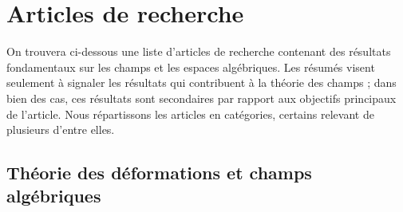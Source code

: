 \section{Articles de recherche}
\label{section-papers}

\noindent
On trouvera ci-dessous une liste d'articles de recherche contenant des résultats
fondamentaux sur les champs et les espaces algébriques. Les résumés visent seulement
à signaler les résultats qui contribuent à la théorie des champs ; dans bien des cas,
ces résultats sont secondaires par rapport aux objectifs principaux de l'article.
Nous répartissons les articles en catégories, certains relevant de plusieurs d'entre elles.


\subsection{Théorie des déformations et champs algébriques}
\label{subsection-deformation-theory}

